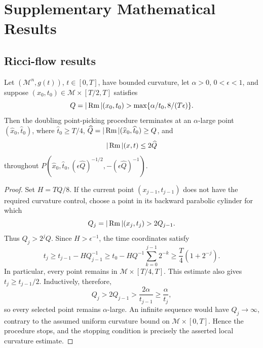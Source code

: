 \chapter{Supplementary Mathematical Results}
\label{app:chow-iii-selected-exercise-solutions}

\section{Ricci-flow results}

\begin{proposition}
\label{prop:chow-iii-appj-solution-22-2}


Let \((\mathcal M^n,g(t))\), \(t\in[0,T]\), have bounded curvature, let
\(\alpha>0\), \(0<\epsilon<1\), and suppose
\((x_0,t_0)\in\mathcal M\times[T/2,T]\) satisfies
\[
 Q=|\operatorname{Rm}|(x_0,t_0)>\max\{\alpha/t_0,8/(T\epsilon)\}.
\]
Then the doubling point-picking procedure terminates at an
\(\alpha\)-large point \((\widehat x_0,\widehat t_0)\), where
\(\widehat t_0\geq T/4\), \(\widehat Q=|\operatorname{Rm}|(\widehat x_0,\widehat t_0)\geq Q\),
and
\[
 |\operatorname{Rm}|(x,t)\leq2\widehat Q
\]
throughout
\(P(\widehat x_0,\widehat t_0,
(\epsilon\widehat Q)^{-1/2},-(\epsilon\widehat Q)^{-1})\).
\end{proposition}
\begin{proof}
\sketch
Set \(H=TQ/8\).  If the current point \((x_{j-1},t_{j-1})\) does not
have the required curvature control, choose a point in its backward
parabolic cylinder for which
\[
 Q_j=|\operatorname{Rm}|(x_j,t_j)>2Q_{j-1}.
\]
Thus \(Q_j>2^jQ\).  Since \(H>\epsilon^{-1}\), the time coordinates satisfy
\[
 t_j\geq t_{j-1}-HQ_{j-1}^{-1}
 \geq t_0-HQ^{-1}\sum_{k=0}^{j-1}2^{-k}
 \geq \frac T4(1+2^{-j}).
\]
In particular, every point remains in \(\mathcal M\times[T/4,T]\).  This
estimate also gives \(t_j\geq t_{j-1}/2\).  Inductively, therefore,
\[
 Q_j>2Q_{j-1}>\frac{2\alpha}{t_{j-1}}
 \geq\frac{\alpha}{t_j},
\]
so every selected point remains \(\alpha\)-large.  An infinite sequence would
have \(Q_j\to\infty\), contrary to the assumed uniform curvature bound on
\(\mathcal M\times[0,T]\).  Hence the procedure stops, and the stopping
condition is precisely the asserted local curvature estimate.
\end{proof}

